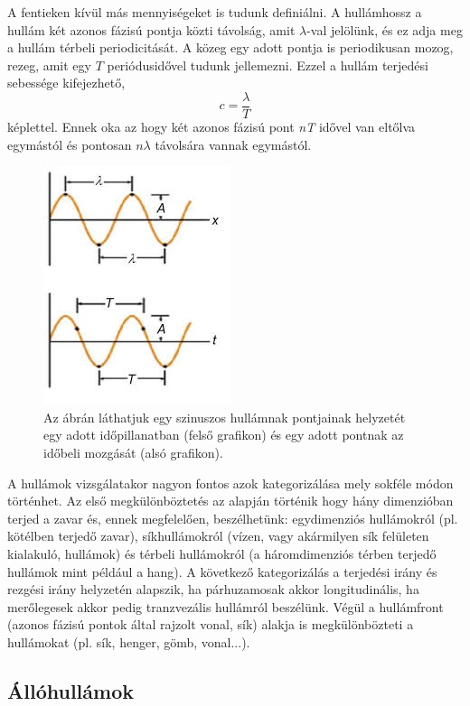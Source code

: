 \documentclass[a4paper,12pt]{article}
\begin{document}
A fentieken kívül más mennyiségeket is tudunk definiálni. A hullámhossz a hullám két azonos fázisú pontja közti távolság, amit $\lambda$-val jelölünk, és ez adja meg a hullám térbeli periodicitását. A közeg egy adott pontja is periodikusan mozog, rezeg, amit egy $T$ periódusidővel tudunk jellemezni. Ezzel a hullám terjedési sebessége kifejezhető,
$$ c=\dfrac{\lambda}{T} $$
képlettel. Ennek oka az hogy két azonos fázisú pont \textit{nT} idővel van eltőlva egymástól és pontosan $n\lambda$ távolsára vannak egymástól.
\begin{figure}[!h]
\centering
\includegraphics[scale=1]{hull_hossz.jpg}
\caption{Az ábrán láthatjuk egy szinuszos hullámnak pontjainak helyzetét egy adott időpillanatban (felső grafikon) és egy adott pontnak az időbeli mozgását (alsó grafikon).}
\end{figure}

A hullámok vizsgálatakor nagyon fontos azok kategorizálása mely sokféle módon történhet. Az első megkülönböztetés az alapján történik hogy hány dimenzióban terjed a zavar és, ennek megfelelően, beszélhetünk: egydimenziós hullámokról (pl. kötélben terjedő zavar), síkhullámokról (vízen, vagy akármilyen sík felületen kialakuló, hullámok) és térbeli hullámokról (a háromdimenziós térben terjedő hullámok mint például a hang). A következő kategorizálás a terjedési irány és rezgési irány helyzetén alapszik, ha párhuzamosak akkor longitudinális, ha merőlegesek akkor pedig tranzvezális hullámról beszélünk. Végül a hullámfront (azonos fázisú pontok által rajzolt vonal, sík) alakja is megkülönbözteti a hullámokat (pl. sík, henger, gömb, vonal...). 

\subsection{Állóhullámok}
\end{document}
